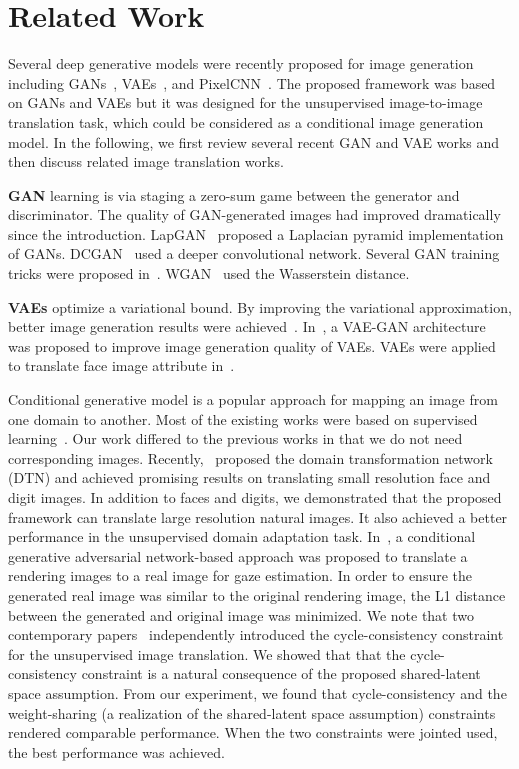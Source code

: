 \documentclass{article}
\begin{document}
 \section{Related Work}

Several deep generative models were recently proposed for image generation including GANs~\cite{goodfellow2014generative}, VAEs~\cite{kingma2013auto,rezende2014stochastic}, and  PixelCNN~\cite{van2016conditional}. The proposed framework was based on GANs and VAEs but it was designed for the unsupervised image-to-image translation task, which could be considered as a conditional image generation model. In the following, we first review several recent GAN and VAE works and then discuss related image translation works.

{\bf GAN} learning is via staging a zero-sum game between the generator and discriminator. The quality of GAN-generated images had improved dramatically since the introduction. LapGAN~\cite{denton2015deep} proposed a Laplacian pyramid implementation of GANs. DCGAN~\cite{radford2015unsupervised} used a deeper convolutional network. Several GAN training tricks were proposed in~\cite{salimans2016improved}. WGAN~\cite{arjovsky2017wasserstein} used the Wasserstein distance.

{\bf VAEs} optimize a variational bound. By improving the variational approximation, better image generation results were achieved~\cite{maaloe2016auxiliary,kingma2016improving}. In~\cite{larsen2015autoencoding}, a VAE-GAN architecture was proposed to improve image generation quality of VAEs. VAEs were applied to translate face image attribute in~\cite{yan2015attribute2image}. 

Conditional generative model is a popular approach for mapping an image from one domain to another. Most of the existing works were based on supervised learning~\cite{ledig2016photo,isola2016image,johnson2016perceptual}. Our work differed to the previous works in that we do not need corresponding images. Recently,~\cite{taigman2016unsupervised} proposed the domain transformation network (DTN) and achieved promising results on translating small resolution face and digit images. In addition to faces and digits, we demonstrated that the proposed framework can translate large resolution natural images. It also achieved a better performance in the unsupervised domain adaptation task. In~\cite{shrivastava2016learning}, a conditional generative adversarial network-based approach was proposed to translate a rendering images to a real image for gaze estimation. In order to ensure the generated real image was similar to the original rendering image, the L1 distance between the generated and original image was minimized. We note that two contemporary papers~\cite{zhu2017unpaired,kim2017learning} independently introduced the cycle-consistency constraint for the unsupervised image translation. We showed that that the cycle-consistency constraint is a natural consequence of the proposed shared-latent space assumption. From our experiment, we found that cycle-consistency and the weight-sharing (a realization of the shared-latent space assumption) constraints rendered comparable performance. When the two constraints were jointed used, the best performance was achieved.
\end{document}
